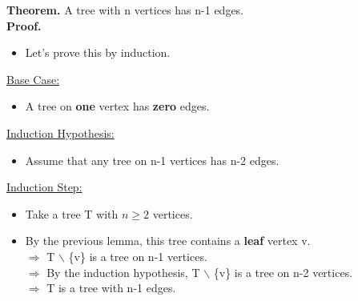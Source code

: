 \documentclass[12pt]{article}
\begin{document}
\begin{itemize}
\textbf{Theorem.}  A tree with n vertices has n-1 edges.\\
\textbf{Proof.}
	\begin{itemize}
	\item Let's prove this by induction.
	\end{itemize}
\underline{Base Case:}
	\begin{itemize}
	\item A tree on \textbf{one} vertex has \textbf{zero} edges.
	\end{itemize}
\underline{Induction Hypothesis:}
	\begin{itemize}
	\item Assume that any tree on n-1 vertices has n-2 edges.
	\end{itemize}
\underline{Induction Step:}
	\begin{itemize}
	\item Take a tree T with $n \geq	 2$ vertices.
	\item By the previous lemma, this tree contains a \textbf{leaf} vertex v.\\
	 $\Rightarrow$ T  $\backslash$ \{v\} is a tree on n-1 vertices.\\
	 $\Rightarrow$ By the induction hypothesis, T  $\backslash$ \{v\} is a tree on n-2 vertices.\\
	 $\Rightarrow$ T is a tree with n-1 edges.
	\end{itemize}
\end{itemize}
\end{document}
